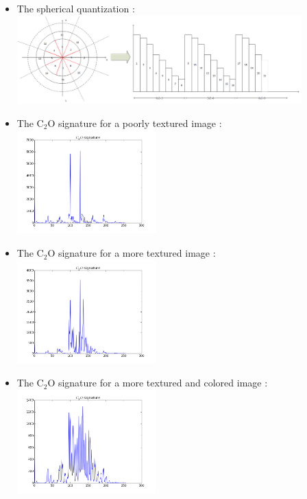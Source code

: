 \documentclass[xcolor=table]{beamer}
\begin{document}
\begin{frame}
\begin{itemize}
\item<1-> The spherical quantization :
 {\includegraphics[height=3.4cm]{QuantificationSphericToHist.png}}
\item<2-> The C$_2$O signature for a poorly textured image :
 {\includegraphics[height=4cm]{C2OSig61p.png}}
\item<3-> The C$_2$O signature for a more textured image :
 {\includegraphics[height=4cm]{C2OSig119p.png}}
\item<4-> The C$_2$O signature for a more textured and colored image :
 {\includegraphics[height=4cm]{C2OSig97p.png}}

\end{itemize}



\end{frame}
\end{document}
